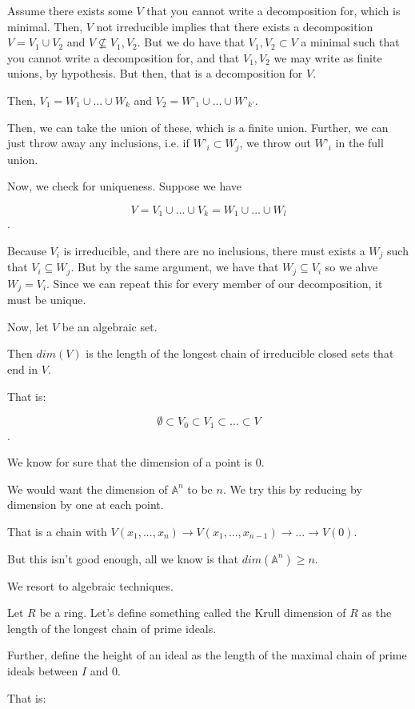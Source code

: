 \documentclass[10pt]{article}
\begin{document}
Assume there exists some $V$ that you cannot write a decomposition for, which is minimal. Then, $V$ not irreducible implies that there exists a decomposition $V = V_1 \cup V_2$ and $V \not \subseteq V_1, V_2$. But we do have that $V_1, V_2 \subset V$ a minimal such that you cannot write a decomposition for, and that $V_1, V_2$ we may write as finite unions, by hypothesis. But then, that is a decomposition for $V$.

Then, $V_1 = W_1 \cup...\cup W_k$ and $V_2 = W’_1 \cup ... \cup W’_{k’}$.

Then, we can take the union of these, which is a finite union. Further, we can just throw away any inclusions, i.e. if $W’_i \subset W_j$, we throw out $W’_i$ in the full union.

Now, we check for uniqueness. Suppose we have

$$ V = V_1 \cup ... \cup V_k = W_1 \cup ... \cup W_l$$. 

Because $V_i$ is irreducible, and there are no inclusions, there must exists a $W_j$ such that $V_i \subseteq W_j$. But by the same argument, we have that $W_j \subseteq V_i$ so we ahve $W_j = V_i$. Since we can repeat this for every member of our decomposition, it must be unique.

Now, let $V$ be an algebraic set.

Then $dim(V)$ is the length of the longest chain of irreducible closed sets that end in $V$.

That is:

$$ \emptyset \subset V_0 \subset V_1 \subset ... \subset V$$.

We know for sure that the dimension of a point is 0.

We would want the dimension of $\mathbb{A}^n$ to be $n$. We try this by reducing by dimension by one at each point.

That is a chain with $V(x_1,...,x_n) \rightarrow V(x_1,...,x_{n-1}) \rightarrow... \rightarrow V(0)$.

But this isn’t good enough, all we know is that $dim(\mathbb{A}^n) \geq n$.

We resort to algebraic techniques.

Let $R$ be a ring. Let’s define something called the Krull dimension of $R$ as the length of the longest chain of prime ideals.

Further, define the height of an ideal as the length of the maximal chain of prime ideals between $I$ and $0$.

That is:
\end{document}
